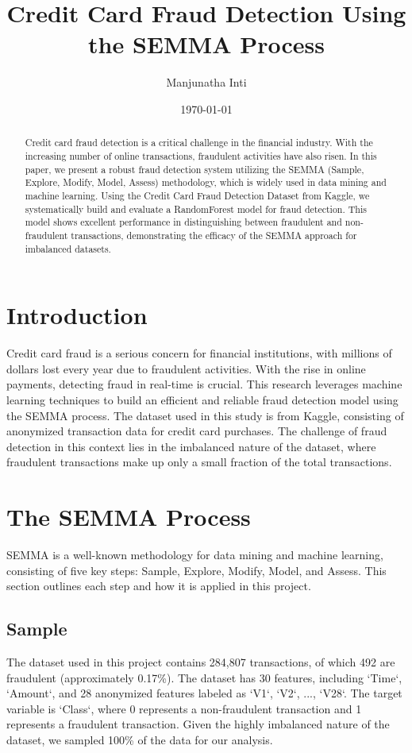 \documentclass[12pt]{article}
\title{Credit Card Fraud Detection Using the SEMMA Process}
\author{Manjunatha Inti}
\date{\today}
\begin{document}
\maketitle

\begin{abstract}
Credit card fraud detection is a critical challenge in the financial industry. With the increasing number of online transactions, fraudulent activities have also risen. In this paper, we present a robust fraud detection system utilizing the SEMMA (Sample, Explore, Modify, Model, Assess) methodology, which is widely used in data mining and machine learning. Using the Credit Card Fraud Detection Dataset from Kaggle, we systematically build and evaluate a RandomForest model for fraud detection. This model shows excellent performance in distinguishing between fraudulent and non-fraudulent transactions, demonstrating the efficacy of the SEMMA approach for imbalanced datasets.
\end{abstract}

\section{Introduction}
Credit card fraud is a serious concern for financial institutions, with millions of dollars lost every year due to fraudulent activities. With the rise in online payments, detecting fraud in real-time is crucial. This research leverages machine learning techniques to build an efficient and reliable fraud detection model using the SEMMA process. The dataset used in this study is from Kaggle, consisting of anonymized transaction data for credit card purchases. The challenge of fraud detection in this context lies in the imbalanced nature of the dataset, where fraudulent transactions make up only a small fraction of the total transactions.

\section{The SEMMA Process}
SEMMA is a well-known methodology for data mining and machine learning, consisting of five key steps: Sample, Explore, Modify, Model, and Assess. This section outlines each step and how it is applied in this project.

\subsection{Sample}
The dataset used in this project contains 284,807 transactions, of which 492 are fraudulent (approximately 0.17\%). The dataset has 30 features, including `Time`, `Amount`, and 28 anonymized features labeled as `V1`, `V2`, ..., `V28`. The target variable is `Class`, where 0 represents a non-fraudulent transaction and 1 represents a fraudulent transaction. Given the highly imbalanced nature of the dataset, we sampled 100\% of the data for our analysis.
\end{document}
